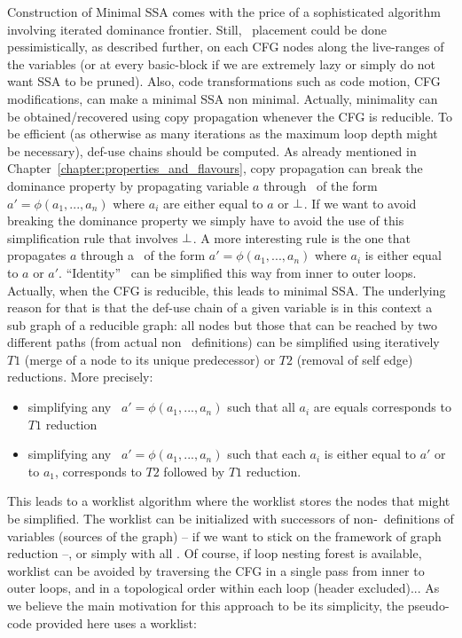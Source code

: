 Construction of Minimal SSA comes with the price of a sophisticated algorithm involving iterated dominance frontier. 
Still, \phiops\ placement could be done pessimistically, as described further, on each CFG nodes along the live-ranges of the variables (or at every basic-block if we are extremely lazy or simply do not want SSA to be pruned). 
Also, code transformations such as code motion, CFG modifications, can make a minimal SSA non minimal.
Actually, minimality can be obtained/recovered using copy propagation whenever the CFG is reducible. 
To be efficient (as otherwise as many iterations as the maximum loop depth might be necessary), def-use chains should be computed. 
As already mentioned in Chapter~\ref{chapter:properties_and_flavours}, copy propagation can break the dominance property by propagating variable $a$ through \phiops\ of the form $a'=\phi(a_1,...,a_n)$ where $a_i$ are either equal to $a$ or $\perp$. 
If we want to avoid breaking the dominance property we simply have to avoid the use of this simplification rule that involves $\perp$. 
A more interesting rule is the one that propagates $a$ through a \phiop\ of the form $a'=\phi(a_1,...,a_n)$ where $a_i$ is either equal to $a$ or $a'$. 
``Identity'' \phiops\ can be simplified this way from inner to outer loops. 
Actually, when the CFG is reducible, this leads to minimal SSA. 
The underlying reason for that is that the def-use chain of a given variable is in this context a sub graph of a reducible graph: 
all nodes but those that can be reached by two different paths (from actual non \phiops\ definitions) can be simplified using iteratively $T1$ (merge of a node to its unique predecessor) or $T2$ (removal of self edge) reductions.
More precisely:
\begin{itemize}
\item simplifying any \phiop\ $a'=\phi(a_1,...,a_n)$ such that all $a_i$ are equals corresponds to $T1$ reduction
\item simplifying any \phiop\ $a'=\phi(a_1,...,a_n)$ such that each $a_i$ is either equal to $a'$ or to $a_1$, corresponds to $T2$ followed by $T1$ reduction.
\end{itemize}
This leads to a worklist algorithm where the worklist stores the nodes that might be simplified. The worklist can be initialized with successors of non-\phiops\ definitions of variables (sources of the graph) -- if we want to stick on the framework of graph reduction --, or simply with all \phiops. Of course, if loop nesting forest is available, worklist can be avoided by traversing the CFG in a single pass from inner to outer loops, and in a topological order within each loop (header excluded)... 
As we believe the main motivation for this approach to be its simplicity, the pseudo-code provided here uses a worklist:

